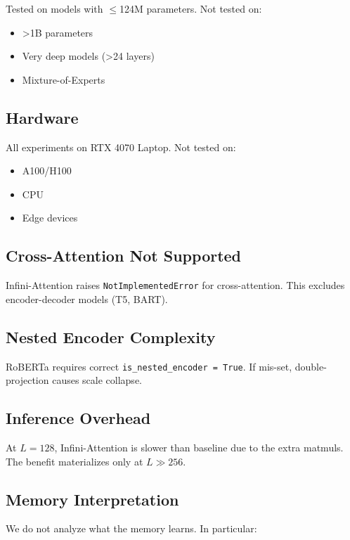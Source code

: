 Tested on models with $\le$124M parameters. Not tested on:

\begin{itemize}
\item >1B parameters
\item Very deep models (>24 layers)
\item Mixture-of-Experts

\end{itemize}
\subsection{Hardware}

All experiments on RTX 4070 Laptop. Not tested on:

\begin{itemize}
\item A100/H100
\item CPU
\item Edge devices

\end{itemize}
\subsection{Cross-Attention Not Supported}

Infini-Attention raises \texttt{NotImplementedError} for cross-attention. This 
excludes encoder-decoder models (T5, BART).

\subsection{Nested Encoder Complexity}

RoBERTa requires correct \texttt{is\_nested\_encoder = True}. If mis-set, 
double-projection causes scale collapse.

\subsection{Inference Overhead}

At $L = 128$, Infini-Attention is slower than baseline due to the extra 
matmuls. The benefit materializes only at $L \gg 256$.

\subsection{Memory Interpretation}

We do not analyze what the memory learns. In particular:

